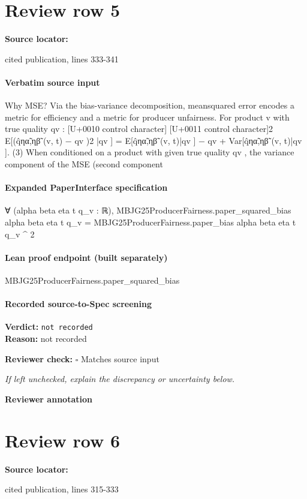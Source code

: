 \documentclass[10pt]{article}
\newcommand{\reviewerbox}{%
  \par\noindent\fbox{\parbox{0.96\linewidth}{\rule{0pt}{0.38in}}}\par
}
\newcommand{\reviewmatch}[1]{%
  \par\noindent\textbf{Reviewer check:} $\square$\; #1\par
  \noindent\emph{If left unchecked, explain the discrepancy or uncertainty below.}\par
}
\begin{document}
\section*{Review row 5}
\textbf{Source locator:} {\footnotesize\raggedright cited publication, lines 333-\allowbreak{}341\par}
\paragraph{Verbatim source input}
\begin{ReviewVerbatim}
Why MSE? Via the bias-variance decomposition, meansquared error encodes a metric for efficiency and a metric
for producer unfairness. For product v with true quality qv :
[U+0010 control character]
[U+0011 control character]2
E[(q̂ηα̃,ηβ̃ (v, t) − qv )2 |qv ] = E[q̂ηα̃,ηβ̃ (v, t)|qv ] − qv
+ Var[q̂ηα̃,ηβ̃ (v, t)|qv ].
(3)
When conditioned on a product with given true quality
qv , the variance component of the MSE (second component
\end{ReviewVerbatim}


\paragraph{Expanded PaperInterface specification}
\begin{ReviewVerbatim}
∀ (alpha beta eta t q_v : ℝ),
  MBJG25ProducerFairness.paper_squared_bias alpha beta eta t q_v =
    MBJG25ProducerFairness.paper_bias alpha beta eta t q_v ^ 2
\end{ReviewVerbatim}

\paragraph{Lean proof endpoint (built separately)}\begin{ReviewVerbatim}
MBJG25ProducerFairness.paper_squared_bias
\end{ReviewVerbatim}

\paragraph{Recorded source-to-Spec screening}
\textbf{Verdict:} \texttt{not recorded}
\\
\textbf{Reason:} not recorded
\reviewmatch{Matches source input}
\noindent\textbf{Reviewer annotation}\par
\reviewerbox
\clearpage
\hypertarget{source-claim-9fd08233a5aeb857}{}
\section*{Review row 6}
\textbf{Source locator:} {\footnotesize\raggedright cited publication, lines 315-\allowbreak{}333\par}
\end{document}
